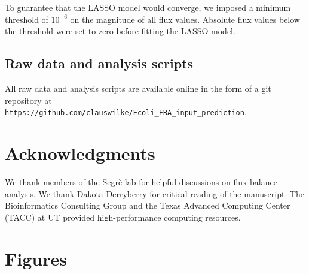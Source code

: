 \documentclass[12pt]{article}
\begin{document}
To guarantee that the LASSO model would converge, we imposed a minimum threshold of $10^{-6}$ on the magnitude of all flux values. Absolute flux values below the threshold were set to zero before fitting the LASSO model.

\subsection{Raw data and analysis scripts}

All raw data and analysis scripts are available online in the form of a git repository at\\ \texttt{https://github.com/clauswilke/Ecoli\_FBA\_input\_prediction}.



\section{Acknowledgments}
We thank members of the Segr\`e lab for helpful discussions on flux balance analysis. We thank Dakota Derryberry for critical reading of the manuscript. The Bioinformatics Consulting Group and the Texas Advanced Computing Center (TACC) at UT provided high-performance computing resources. 




\newpage

\section*{Figures}
\end{document}
